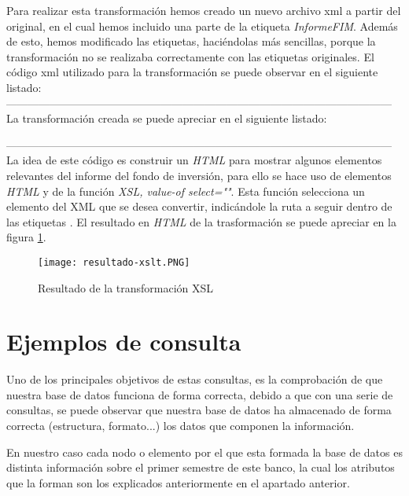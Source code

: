 \documentclass[11pt]{diazessay} %
\begin{document}
Para realizar esta transformación hemos creado un nuevo archivo xml a partir del original, en el cual hemos incluido una parte de la etiqueta \textit{InformeFIM}. Además de esto, hemos modificado las etiquetas, haciéndolas más sencillas, porque la transformación no se realizaba correctamente con las etiquetas originales. El código xml utilizado para la transformación se puede observar en el siguiente listado:\\

 
---------------------------------------------------------------------------------------------------------\\

La transformación  creada se puede apreciar en el siguiente listado:
 
---------------------------------------------------------------------------------------------------------\\

La idea de este código es construir un \textit{HTML} para mostrar algunos elementos relevantes del informe del fondo de inversión, para ello se hace uso de elementos \textit{HTML} y de la función \textit{XSL, value-of select=""}. Esta función selecciona un elemento del XML que se desea convertir, indicándole la ruta a seguir dentro de las etiquetas \cite{xsl_valueof}. El resultado en \textit{HTML} de la trasformación se puede apreciar en la figura \ref{fig:xslt_result}.\\

\begin{figure}[h!]
	\texttt{[image: resultado-xslt.PNG]}
	\caption{Resultado de la transformación XSL}
	\label{fig:xslt_result}
\end{figure}


\newpage
\section*{Ejemplos de consulta}
Uno de los principales objetivos de estas consultas, es la comprobación de que nuestra base de datos funciona de forma correcta, debido a que con una serie de consultas, se puede observar que nuestra base de datos ha almacenado de forma correcta (estructura, formato...) los datos que componen la información. 

En nuestro caso cada nodo o elemento por el que esta formada la base de datos es distinta información sobre el primer semestre de este banco, la cual los atributos que la forman son los explicados anteriormente en el apartado anterior.\\
\end{document}
